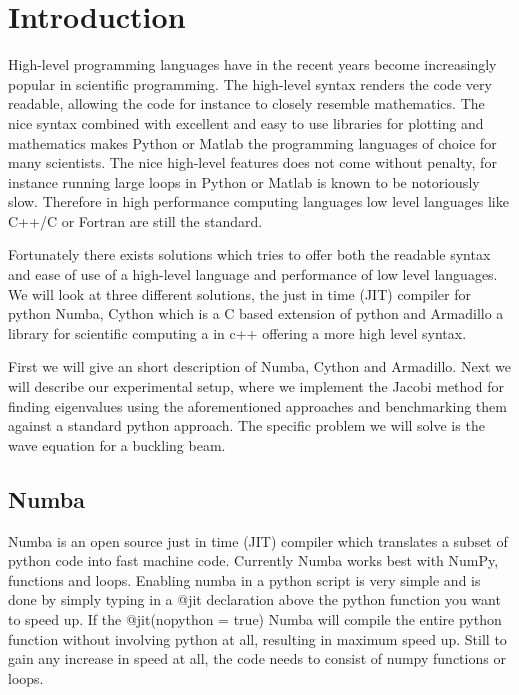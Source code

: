 \section*{Introduction}

High-level programming languages have in the recent years become increasingly
popular in scientific programming. The high-level syntax renders the code very
readable,
allowing the code for instance to closely resemble mathematics. The nice syntax
combined with excellent and easy to use libraries
for plotting and mathematics makes Python or Matlab the
programming languages of choice for many scientists.
The nice high-level features does not come without penalty, for
instance running large loops in Python or Matlab is known to be notoriously slow.
Therefore in high performance computing languages low level languages like C++/C
or Fortran are still the standard.

Fortunately there exists solutions which tries to offer both the readable syntax
and ease of use of a high-level language and performance of low level languages.
We will
look at three different solutions, the just in time (JIT) compiler for python
Numba, Cython which is a C based extension of python and Armadillo a
library for scientific computing a in c++ offering a more high level syntax.

First we will give an short description of Numba, Cython and Armadillo.
Next we will describe our experimental setup, where we implement the Jacobi
method for finding eigenvalues using the aforementioned approaches and
benchmarking them against a standard python approach. The specific problem we
will solve is the wave equation for a buckling beam.


\subsection*{Numba}
Numba is an open source just in time (JIT) compiler which translates a subset of
python code
into fast machine code. Currently Numba works best with NumPy, functions
and loops. Enabling numba in a python script is very simple and is done by
simply typing in a @jit declaration above the python function you want to speed
up. If the @jit(nopython = true) Numba will compile the entire python function
without involving python at all, resulting in maximum speed up. Still to gain
any increase in speed at all, the code needs to consist of
numpy functions or loops.

